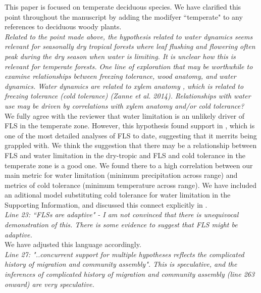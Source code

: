 \documentclass{article}[11pt]
\begin{document}
\noindent This paper is focused on temperate deciduous species. We have clarified this point throughout the manuscript by adding the modifyer ``temperate" to any references to deciduous woody plants.\\

\emph{Related to the point made above, the hypothesis related to water dynamics seems relevant for seasonally dry tropical forests where leaf flushing and flowering often peak during the dry season when water is limiting. It is unclear how this is relevant for temperate forests. One line of exploration that may be worthwhile to examine relationships between freezing tolerance, wood anatomy, and water dynamics. Water dynamics are related to xylem anatomy , which is related to freezing tolerance (cold tolerance) (Zanne et al. 2014). Relationships with water use may be driven by correlations with xylem anatomy and/or cold tolerance?}\\

\noindent We fully agree with the reviewer that water limitation is an unlikely driver of FLS in the temperate zone. However, this hypothesis found support in \citet{Gougherty2018}, which is one of the most detailed analyses of FLS to date, suggesting that it merrits being grappled with. We think the suggestion that there may be a relationship between FLS and water limitation in the dry-tropic and FLS and cold tolerance in the temperate zone is a good one. We found there to a high correlation between our main metric for water limitation (minimum precipitation across range) and metrics of cold tolerance (minimum temperature across range). We have included an aditional model substituting cold tolerance for water limitation in the Supporting Information, and discussed this connect explicitly in .\\

\emph{Line 23: ``FLSs are adaptive" - I am not convinced that there is unequivocal demonstration of this. There is some evidence to suggest that FLS might be adaptive.}\\

\noident We have adjusted this language accordingly.\\

\emph{Line 27: "..concurrent support for multiple hypotheses reflects the complicated history of migration and community assembly".  This is speculative, and the inferences of complicated history of migration and community assembly (line 263 onward) are very speculative.}\\
\end{document}

